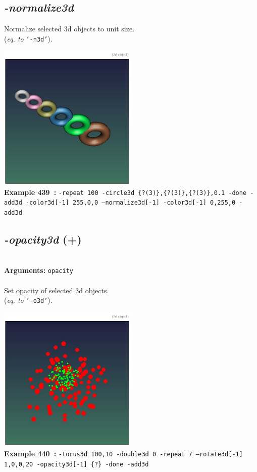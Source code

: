 \documentclass[a4paper,11pt,twoside]{book}
\begin{document}
\subsection{\emph{-normalize3d} }\vspace*{-0.5em}
Normalize selected 3d objects to unit size.
~\\(\emph{eq. to} {\small \texttt{'-n3d'}}).
\begin{center}\includegraphics[keepaspectratio=true,height=7cm,width=\textwidth]{img/gmic_def439.jpg}\\
{\footnotesize \textbf{Example 439~:} \texttt{-repeat 100 -circle3d \{?(3)\},\{?(3)\},\{?(3)\},0.1 -done -add3d -color3d[-1] 255,0,0 --normalize3d[-1] -color3d[-1] 0,255,0 -add3d}}
\end{center}

\subsection{\emph{-opacity3d} (+)}\vspace*{-0.5em}
~\\\textbf{Arguments: } 
{\small \texttt{opacity}}\\~\\
Set opacity of selected 3d objects.
~\\(\emph{eq. to} {\small \texttt{'-o3d'}}).
\begin{center}\includegraphics[keepaspectratio=true,height=7cm,width=\textwidth]{img/gmic_def440.jpg}\\
{\footnotesize \textbf{Example 440~:} \texttt{-torus3d 100,10 -double3d 0 -repeat 7 --rotate3d[-1] 1,0,0,20 -opacity3d[-1] \{?\} -done -add3d}}
\end{center}
\end{document}
